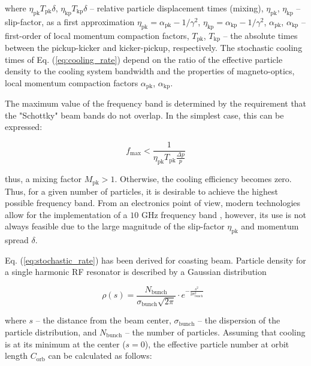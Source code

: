 \documentclass[submitting]{nst}
\begin{document}
	\noindent where $\eta_{\text{pk}}T_{\text{pk}}\delta$, $\eta_{\text{kp}}T_{\text{kp}}\delta$ -- relative particle displacement times (mixing),  $\eta_{\text{pk}}$, $\eta_{\text{kp}}$ -- slip-factor, as a first approximation $\eta_{\text{pk}}=\alpha_{\text{pk}}-1/\gamma^2$, $\eta_{\text{kp}}=\alpha_{\text{kp}}-1/\gamma^2$, $\alpha_{\text{pk}}$, $\alpha_{\text{kp}}$ -- first-order of local momentum compaction factors, $T_{\text{pk}}$, $T_{\text{kp}}$ -- the absolute times between the pickup-kicker and kicker-pickup, respectively. The stochastic cooling times of Eq. (\ref{eq:cooling_rate}) depend on the ratio of the effective particle density to the cooling system bandwidth and the properties of magneto-optics, local momentum compaction factors $\alpha_{\text{pk}}$, $\alpha_{\text{kp}}$.
	
	\par The maximum value of the frequency band is determined by the requirement that the "Schottky" beam bands do not overlap. In the simplest case, this can be expressed:
	
	\begin{equation}
		f_{\textrm{max}}<\frac{1}{\eta_{\textrm{pk}}T_{\textrm{pk}}\frac{\Delta p}{p}}
	\end{equation}
	
	\noindent thus, a mixing factor $M_{\text{pk}}>1$. Otherwise, the cooling efficiency becomes zero. Thus, for a given number of particles, it is desirable to achieve the highest possible frequency band. From an electronics point of view, modern technologies allow for the implementation of a $10$ GHz frequency band \cite{b7}, however, its use is not always feasible due to the large magnitude of the slip-factor $\eta_{\text{pk}}$ and momentum spread $\delta$.
	
	\par Eq. (\ref{eq:stochastic_rate}) has been derived for coasting beam. Particle density for a single harmonic RF resonator is described by a Gaussian distribution
	
	\begin{equation}
		\rho(s)=\frac{N_{\textrm{bunch}}}{\sigma_{\textrm{bunch}}\sqrt{2\pi}}\cdot e^{-\frac{s^2}{2\sigma_{\textrm{bunch}}^2}}\ \ \ 
	\end{equation}	
	
	\noindent where $s$ – the distance from the beam center, $\sigma_{\text{bunch}}$ – the dispersion of the particle distribution, and $N_{\text{bunch}}$ – the number of particles. Assuming that cooling is at its minimum at the center ($s=0$), the effective particle number at orbit length $C_{\text{orb}}$ can be calculated as follows:
	
\end{document}
